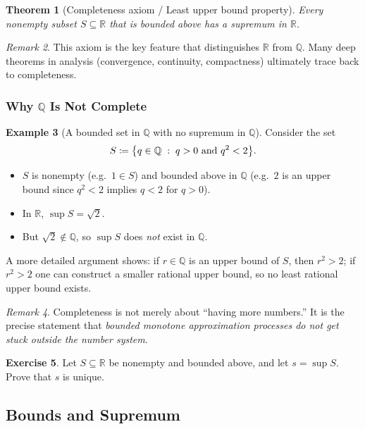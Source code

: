 \documentclass[12pt]{article}
\numberwithin{equation}{section}
\newcommand{\RR}{\mathbb{R}}
\newcommand{\QQ}{\mathbb{Q}}
\DeclarePairedDelimiter{\set}{\{}{\}}
\newcommand{\st}{\;:\;}                      %
\theoremstyle{plain}
\newtheorem{theorem}{Theorem}[section]
\theoremstyle{definition}
\newtheorem{example}[theorem]{Example}
\newtheorem{exercise}[theorem]{Exercise}
\theoremstyle{remark}
\newtheorem{remark}[theorem]{Remark}
\begin{document}
\begin{theorem}[Completeness axiom / Least upper bound property]\label{thm:completeness}
Every nonempty subset $S\subseteq\RR$ that is bounded above has a supremum in $\RR$.
\end{theorem}

\begin{remark}
This axiom is the key feature that distinguishes $\RR$ from $\QQ$. Many deep theorems in analysis (convergence, continuity, compactness) ultimately trace back to completeness.
\end{remark}

\subsubsection{Why $\QQ$ Is Not Complete}

\begin{example}[A bounded set in $\QQ$ with no supremum in $\QQ$]\label{ex:Q-not-complete}
Consider the set
\[
S \coloneqq \set*{q\in\QQ \st q>0 \text{ and } q^2<2}.
\]
\begin{itemize}
\item $S$ is nonempty (e.g.\ $1\in S$) and bounded above in $\QQ$ (e.g.\ $2$ is an upper bound since $q^2<2$ implies $q<2$ for $q>0$).
\item In $\RR$, $\sup S=\sqrt{2}$.
\item But $\sqrt{2}\notin\QQ$, so $\sup S$ does \emph{not} exist in $\QQ$.
\end{itemize}
A more detailed argument shows: if $r\in\QQ$ is an upper bound of $S$, then $r^2>2$; if $r^2>2$ one can construct a smaller rational upper bound, so no least rational upper bound exists.
\end{example}

\begin{remark}
Completeness is not merely about “having more numbers.” It is the precise statement that \emph{bounded monotone approximation processes do not get stuck outside the number system}.
\end{remark}

\begin{exercise}
Let $S\subseteq \RR$ be nonempty and bounded above, and let $s=\sup S$. Prove that $s$ is unique.
\end{exercise}

\newpage

\subsection{Bounds and Supremum}
\end{document}
